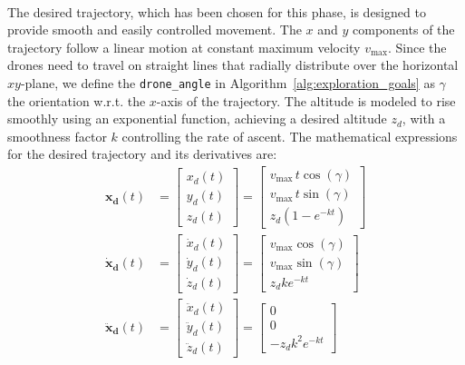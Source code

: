 \documentclass[main]{subfiles}
\begin{document}
\noindent\\
The desired trajectory, which has been chosen for this phase,
is designed to provide smooth and easily controlled movement. 
The \(x\) and \(y\) components of the trajectory follow 
a linear motion at constant maximum velocity \(v_{\text{max}}\). 
Since the drones need to travel on straight lines that 
radially distribute over the horizontal $xy$-plane, we 
define the \texttt{drone\_angle} in Algorithm~\ref{alg:exploration_goals} as
\(\gamma \) the orientation w.r.t. the $x$-axis of the trajectory.
The altitude is modeled to rise smoothly 
using an exponential function, achieving a desired altitude \(z_d\), 
with a smoothness factor \(k\) controlling the rate of ascent. 
The mathematical expressions for the desired trajectory and 
its derivatives are:
\begin{equation}
\begin{aligned}
\mathbf{x_d}(t) &= 
\begin{bmatrix}
x_d(t) \\ y_d(t) \\ z_d(t)
\end{bmatrix}
=
\begin{bmatrix}
v_{\text{max}} \, t \cos(\gamma) \\
v_{\text{max}} \, t \sin(\gamma) \\
z_d \left(1 - e^{-k t}\right)
\end{bmatrix} \\[10pt]
\mathbf{\dot{x}_d}(t) &= 
\begin{bmatrix}
\dot{x}_d(t) \\ \dot{y}_d(t) \\ \dot{z}_d(t)
\end{bmatrix}
=
\begin{bmatrix}
v_{\text{max}} \cos(\gamma) \\
v_{\text{max}} \sin(\gamma) \\
z_d k e^{-k t}
\end{bmatrix} \\[10pt]
\mathbf{\ddot{x}_d}(t) &= 
\begin{bmatrix}
\ddot{x}_d(t) \\ \ddot{y}_d(t) \\ \ddot{z}_d(t)
\end{bmatrix}
=
\begin{bmatrix}
0 \\
0 \\
-z_d k^2 e^{-k t}
\end{bmatrix}
\end{aligned}
\end{equation}
    
\end{document}
